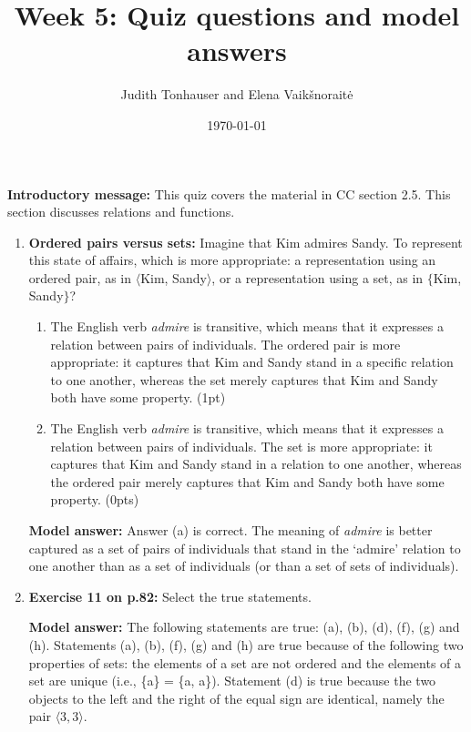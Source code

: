 \documentclass[a4,11pt]{article}
\title{Week 5: Quiz questions and model answers}
\author{Judith Tonhauser and Elena Vaik\v snorait\.{e} }
\date{\today}
\begin{document}
\maketitle

{\bf Introductory message:} This quiz covers the material in CC section 2.5. This section discusses relations and functions.

\begin{enumerate}[leftmargin = 12pt]

\item {\bf Ordered pairs versus sets:} Imagine that Kim admires Sandy. To represent this state of affairs, which is more appropriate: a representation using an ordered pair, as in $\langle$Kim, Sandy$\rangle$, or a representation using a set, as in $\{$Kim, Sandy$\}$?

 \begin{enumerate}[noitemsep]
        \item The English verb {\em admire} is transitive, which means that it expresses a relation between pairs of individuals. The ordered pair is more appropriate: it captures that Kim and Sandy stand in a specific relation to one another, whereas the set merely captures that Kim and Sandy both have some property. (1pt)
        
        \item The English verb {\em admire} is transitive, which means that it expresses a relation between pairs of individuals. The set is more appropriate: it captures that Kim and Sandy stand in a relation to one another, whereas the ordered pair merely captures that Kim and Sandy both have some property. (0pts)
\end{enumerate}

{\bf Model answer:} Answer (a) is correct. The meaning of {\em admire} is better captured as a set of pairs of individuals that stand in the `admire' relation to one another than as a set of individuals (or than a set of sets of individuals).

\item {\bf Exercise 11 on p.82:} Select the true statements.

{\bf Model answer:}  The following statements are true: (a), (b), (d), (f), (g) and (h). Statements (a), (b), (f), (g) and (h) are true because of the following two properties of sets: the elements of a set are not ordered and the elements of a set are unique (i.e., \{a\} = \{a, a\}). Statement (d) is true because the two objects to the left and the right of the equal sign are identical, namely the pair $\langle 3,3 \rangle$. 


\end{enumerate}
\end{document}
